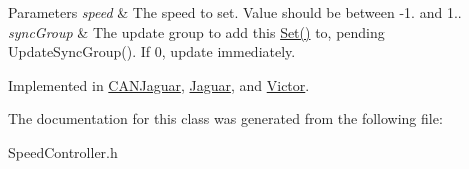 \begin{DoxyParams}{\-Parameters}
{\em speed} & \-The speed to set. \-Value should be between -\/1. and 1.. \\
\hline
{\em sync\-Group} & \-The update group to add this \hyperlink{classSpeedController_abaa1c81b41a9cc673fe92978bb12f82e}{\-Set()} to, pending \-Update\-Sync\-Group(). \-If 0, update immediately. \\
\hline
\end{DoxyParams}


\-Implemented in \hyperlink{classCANJaguar_aa8a4f32b3c1839557cd73996693a116a}{\-C\-A\-N\-Jaguar}, \hyperlink{classJaguar_a1a15089e9ea94102f1d003bce3ae2f54}{\-Jaguar}, and \hyperlink{classVictor_aabd64f11a67851b3a4eed9b2ea1016ca}{\-Victor}.



\-The documentation for this class was generated from the following file\-:\begin{DoxyCompactItemize}
\item 
\-Speed\-Controller.\-h\end{DoxyCompactItemize}
